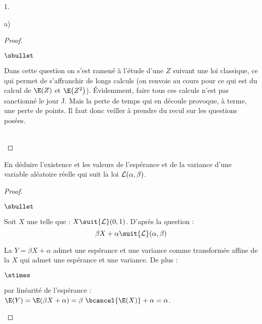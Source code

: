 \documentclass[11pt]{article}%
\begin{document}
\begin{noliste}{1.}
\begin{noliste}{a)}
\begin{proof}
\begin{remark}
\begin{noliste}{$\sbullet$}
        \item Dans cette question on s'est ramené à l'étude d'une \var
          $Z$ suivant une loi classique, ce qui permet de s'affranchir
          de longs calculs (on renvoie au cours pour ce qui est du
          calcul de $\E(Z)$ et $\E\big( Z^2 \big)$). Évidemment, faire
          tous ces calculs n'est pas sanctionné le jour J. Mais la
          perte de temps qui en découle provoque, à terme, une perte
          de points. Il faut donc veiller à prendre du recul sur les
          questions posées.          
        \end{noliste}
      \end{remark}~\\[-1.2cm]
    \end{proof}

  \item En déduire l'existence et les valeurs de l'espérance et de la
    variance d'une variable aléatoire réelle qui suit la loi ${\cal
      L}(\alpha,\beta)$.

    \begin{proof}~
      \begin{noliste}{$\sbullet$}
      \item Soit $X$ une \var telle que : $X \suit {\cal L}(0,
        1)$. D'après la question  :
        \[
        \beta X + \alpha \suit {\cal L}(\alpha, \beta)
        \]
        
        
        
        \newpage
        
        
        
      \item La \var $Y = \beta X + \alpha$ admet une espérance et une
        variance comme transformée affine de la \var $X$ qui admet une
        espérance et une variance. De plus : 
        \begin{noliste}{$\stimes$}
        \item par linéarité de l'espérance : $\E(Y) = \E(\beta X +
          \alpha) = \beta \ \bcancel{\E(X)} + \alpha = \alpha$.


\end{noliste}
\end{noliste}
\end{proof}
\end{noliste}
\end{noliste}
\end{document}
